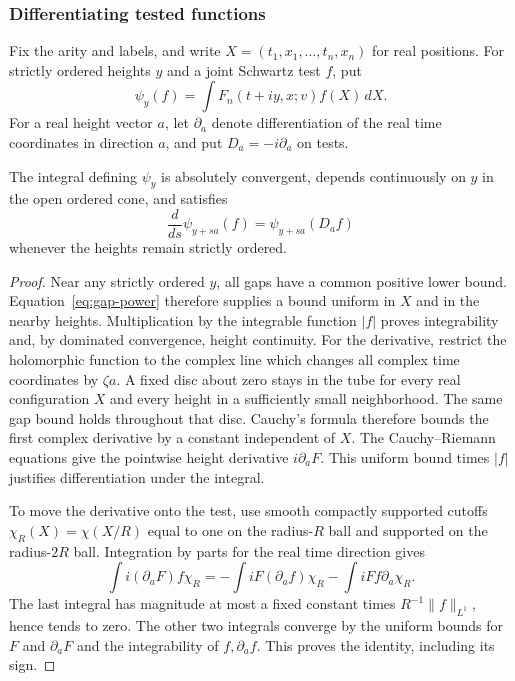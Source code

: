 \subsubsection{Differentiating tested functions}
Fix the arity and labels, and write $X=(t_1,x_1,\ldots,t_n,x_n)$ for real
positions. For strictly ordered heights $y$ and a joint Schwartz test $f$, put
\[
 \psi_y(f)=\int F_n(t+iy,x;v)f(X)\,dX.
\]
For a real height vector $a$, let $\partial_a$ denote differentiation of the
real time coordinates in direction $a$, and put $D_a=-i\partial_a$ on tests.
\begin{lemma}\label{lem:tested-cr}
The integral defining $\psi_y$ is absolutely convergent, depends continuously
on $y$ in the open ordered cone, and satisfies
\[
 \frac{d}{ds}\psi_{y+sa}(f)=\psi_{y+sa}(D_af)
\]
whenever the heights remain strictly ordered.
\end{lemma}
\begin{proof}
Near any strictly ordered $y$, all gaps have a common positive lower bound.
Equation~\eqref{eq:gap-power} therefore supplies a bound uniform in $X$ and
in the nearby heights. Multiplication by the integrable function $|f|$
proves integrability and, by dominated convergence, height continuity.
For the derivative, restrict the holomorphic function to the complex line
which changes all complex time coordinates by $\zeta a$. A fixed disc about
zero stays in the tube for every real configuration $X$ and every height in
a sufficiently small neighborhood. The same gap bound holds throughout that
disc. Cauchy's formula therefore bounds the first complex derivative by a
constant independent of $X$. The Cauchy--Riemann equations give the pointwise
height derivative $i\partial_aF$. This uniform bound times $|f|$ justifies
differentiation under the integral.

To move the derivative onto the test, use smooth compactly supported cutoffs
$\chi_R(X)=\chi(X/R)$ equal to one on the radius-$R$ ball and supported on
the radius-$2R$ ball. Integration by parts for the real time direction gives
\[
 \int i(\partial_aF)f\chi_R
 =-\int iF(\partial_af)\chi_R-\int iFf\partial_a\chi_R.
\]
The last integral has magnitude at most a fixed constant times
$R^{-1}\|f\|_{L^1}$, hence tends to zero. The other two integrals converge
by the uniform bounds for $F$ and $\partial_aF$ and the integrability of
$f,\partial_af$. This proves the identity, including its sign.
\end{proof}

